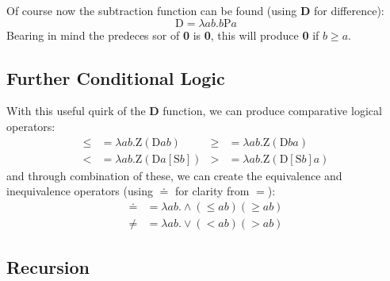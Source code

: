 \documentclass[Master.tex]{subfiles}
\begin{document}
Of course now the subtraction function can be found (using \textbf{D} for difference):
\begin{equation*}
\bm{\mathrm{D}} = \lambda ab.b\bm{\mathrm{P}}a
\end{equation*}
Bearing in mind the predeces sor of \textbf{0} is \textbf{0}, this will produce \textbf{0} if $b\geq a$.
\subsection{Further Conditional Logic}

With this useful quirk of the \textbf{D} function, we can produce comparative logical operators:
\begin{equation*}
\begin{aligned}
\bm{\leq} &= \lambda ab.\bm{\mathrm{Z}}(\bm{\mathrm{D}}ab)
  & %
\bm{\geq} &= \lambda ab.\bm{\mathrm{Z}}(\bm{\mathrm{D}}ba)
  \\
\bm{<} &= \lambda ab.\bm{\mathrm{Z}}(\bm{\mathrm{D}}a[\bm{\mathrm{S}}b])
  &
\bm{>} &= \lambda ab.\bm{\mathrm{Z}}(\bm{\mathrm{D}}[\bm{\mathrm{S}}b]a)
\end{aligned}
\end{equation*}
and through combination of these, we can create the equivalence and inequivalence operators (using $\bm{\doteq}$ for clarity from $=$):
\begin{equation*}
\begin{aligned}
\bm{\doteq} &= \lambda ab.\wedge(\bm{\leq}ab)(\bm{\geq}ab)\\
\bm{\neq} &= \lambda ab.\vee(\bm{<}ab)(\bm{>}ab)
\end{aligned}
\end{equation*}
\subsection{Recursion}
\end{document}
